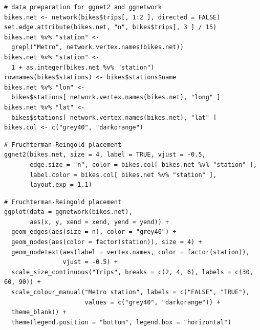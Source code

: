 \begin{knitrout}
\color{fgcolor}\begin{kframe}
\begin{verbatim}
# data preparation for ggnet2 and ggnetwork
bikes.net <- network(bikes$trips[, 1:2 ], directed = FALSE)
set.edge.attribute(bikes.net, "n", bikes$trips[, 3 ] / 15)
bikes.net %v% "station" <-
  grepl("Metro", network.vertex.names(bikes.net))
bikes.net %v% "station" <-
  1 + as.integer(bikes.net %v% "station")
rownames(bikes$stations) <- bikes$stations$name
bikes.net %v% "lon" <-
  bikes$stations[ network.vertex.names(bikes.net), "long" ]
bikes.net %v% "lat" <-
  bikes$stations[ network.vertex.names(bikes.net), "lat" ]
bikes.col <- c("grey40", "darkorange")
\end{verbatim}
\end{kframe}
\end{knitrout}

\begin{knitrout}
\color{fgcolor}\begin{kframe}
\begin{verbatim}
# Fruchterman-Reingold placement
ggnet2(bikes.net, size = 4, label = TRUE, vjust = -0.5,
       edge.size = "n", color = bikes.col[ bikes.net %v% "station" ],
       label.color = bikes.col[ bikes.net %v% "station" ],
       layout.exp = 1.1)
\end{verbatim}
\end{kframe}
\end{knitrout}

\begin{knitrout}
\color{fgcolor}\begin{kframe}
\begin{verbatim}
# Fruchterman-Reingold placement
ggplot(data = ggnetwork(bikes.net),
       aes(x, y, xend = xend, yend = yend)) +
  geom_edges(aes(size = n), color = "grey40") +
  geom_nodes(aes(color = factor(station)), size = 4) +
  geom_nodetext(aes(label = vertex.names, color = factor(station)),
                vjust = -0.5) +
  scale_size_continuous("Trips", breaks = c(2, 4, 6), labels = c(30, 60, 90)) +
  scale_colour_manual("Metro station", labels = c("FALSE", "TRUE"),
                      values = c("grey40", "darkorange")) +
  theme_blank() +
  theme(legend.position = "bottom", legend.box = "horizontal")
\end{verbatim}
\end{kframe}
\end{knitrout}

